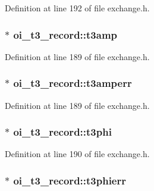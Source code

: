 Definition at line 192 of file exchange.h.

\hypertarget{structoi__t3__record_adfcdebe6934de0a96674fcfae0c3e6a4}{
\subsubsection[{t3amp}]{$\ast$ {\bf oi\_\-t3\_\-record::t3amp}}}
\label{structoi__t3__record_adfcdebe6934de0a96674fcfae0c3e6a4}


Definition at line 189 of file exchange.h.

\hypertarget{structoi__t3__record_a16deb89e2d6aca09e9170d0df9ab0964}{
\subsubsection[{t3amperr}]{ $\ast$ {\bf oi\_\-t3\_\-record::t3amperr}}}
\label{structoi__t3__record_a16deb89e2d6aca09e9170d0df9ab0964}


Definition at line 189 of file exchange.h.

\hypertarget{structoi__t3__record_a0038d03c36f8fe8dd9d583eb3885157b}{
\subsubsection[{t3phi}]{$\ast$ {\bf oi\_\-t3\_\-record::t3phi}}}
\label{structoi__t3__record_a0038d03c36f8fe8dd9d583eb3885157b}


Definition at line 190 of file exchange.h.

\hypertarget{structoi__t3__record_ab71f2c95698f1a5d70b184c5e389cf24}{
\subsubsection[{t3phierr}]{ $\ast$ {\bf oi\_\-t3\_\-record::t3phierr}}}
\label{structoi__t3__record_ab71f2c95698f1a5d70b184c5e389cf24}


